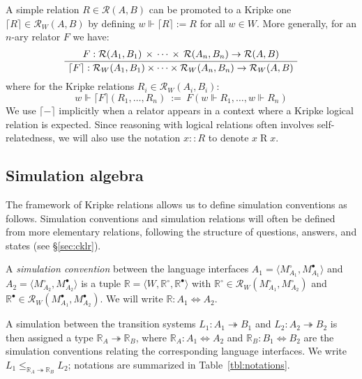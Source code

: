 \documentclass[acmsmall,authordraft]{acmart}
\newcommand{\que}{\circ}
\newcommand{\ans}{\bullet}
\begin{document}
A simple relation $R \in \mathcal{R}(A, B)$
can be promoted to a Kripke one
$\lceil R \rceil \in \mathcal{R}_W(A, B)$
by defining $w \Vdash \lceil R \rceil := R$ for all $w \in W$.
More generally, for an $n$-ary relator $F$ we have:
\[
  \AxiomC{$
    F :
      \mathcal{R}(A_1, B_1) \,\times\,\cdots\,\times\,\mathcal{R}(A_n, B_n)
      \rightarrow \mathcal{R}(A, B)$}
  \UnaryInfC{$
    \lceil F \rceil :
      \mathcal{R}_W(A_1, B_1) \times \cdots \times \mathcal{R}_W(A_n, B_n)
      \rightarrow \mathcal{R}_W(A, B)$}
  \DisplayProof
\]
where for the Kripke relations $R_i \in \mathcal{R}_W(A_i, B_i)$:
\[
  w \Vdash \lceil F \rceil (R_1, \ldots, R_n) \: := \:
    F(w \Vdash R_1, \ldots, w \Vdash R_n)
\]
We use $\lceil - \rceil$ implicitly
when a relator appears in a context where
a Kripke logical relation is expected.
Since reasoning with logical relations
often involves self-relatedness,
we will also use the notation
$x :: R$ to denote $x \mathrel{R} x$.


\subsection{Simulation algebra} %

The framework of Kripke relations allows us
to define simulation conventions as follows.
Simulation conventions and simulation relations
will often be defined from
more elementary relations,
following the structure of questions, answers, and states
(see \S\ref{sec:cklr}).

\begin{definition} \label{def:simconv} %
A \emph{simulation convention} between the language interfaces
$A_1 = \langle M_{A_1}^\que, M_{A_1}^\ans \rangle$ and
$A_2 = \langle M_{A_2}^\que, M_{A_2}^\ans \rangle$
is a tuple $\mathbb{R} = \langle W, \mathbb{R}^\que, \mathbb{R}^\ans \rangle$
with $\mathbb{R}^\que \in \mathcal{R}_W(M_{A_1}^\que, M_{A_2}^\que)$
and $\mathbb{R}^\ans \in \mathcal{R}_W(M_{A_1}^\ans, M_{A_2}^\ans)$.
We will write $\mathbb{R} : A_1 \Leftrightarrow A_2$.
\end{definition}

A simulation between the transition systems
$L_1 : A_1 \twoheadrightarrow B_1$ and
$L_2 : A_2 \twoheadrightarrow B_2$
is then assigned a type $\mathbb{R}_A \twoheadrightarrow \mathbb{R}_B$,
where %
$\mathbb{R}_A : A_1 \Leftrightarrow A_2$ and
$\mathbb{R}_B : B_1 \Leftrightarrow B_2$
are the simulation conventions
relating the corresponding language interfaces.
We write
$L_1 \le_{\mathbb{R}_A \twoheadrightarrow \mathbb{R}_B} L_2$;
notations are summarized in Table~\ref{tbl:notations}.
\end{document}
